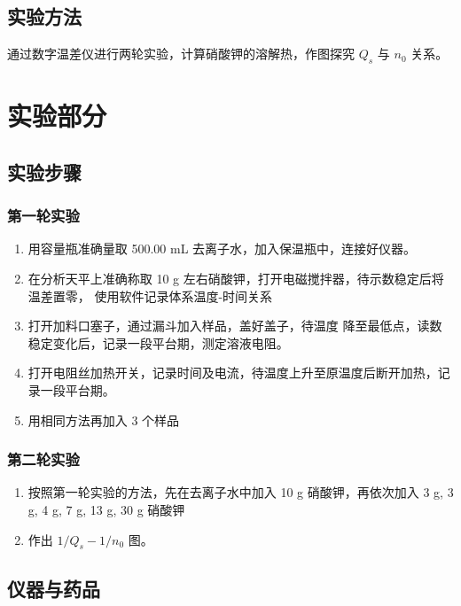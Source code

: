 \documentclass[cn,hazy,pku,12pt,normal,math=newtx,cite=super]{elegantnote}
\begin{document}
\subsection{实验方法}

通过数字温差仪进行两轮实验，计算硝酸钾的溶解热，作图探究 $Q_s$ 与 $n_0$ 关系。

\section{实验部分}

\subsection{实验步骤}
\subsubsection{第一轮实验}

\begin{enumerate}
    \item  用容量瓶准确量取 500.00 mL 去离子水，加入保温瓶中，连接好仪器。
    \item  在分析天平上准确称取 10 g 左右硝酸钾，打开电磁搅拌器，待示数稳定后将温差置零，
    使用软件记录体系温度-时间关系
    \item  打开加料口塞子，通过漏斗加入样品，盖好盖子，待温度
    降至最低点，读数稳定变化后，记录一段平台期，测定溶液电阻。
    \item  打开电阻丝加热开关，记录时间及电流，待温度上升至原温度后断开加热，记录一段平台期。
    \item  用相同方法再加入 3 个样品
\end{enumerate}

\subsubsection{第二轮实验}

\begin{enumerate}
    \item  按照第一轮实验的方法，先在去离子水中加入 10 g 硝酸钾，再依次加入 3 g, 3 g, 4 g, 7 g, 13 g, 30 g 硝酸钾
    \item  作出 $1/Q_s - 1/n_0$ 图。
\end{enumerate}

\subsection{仪器与药品}
\end{document}
